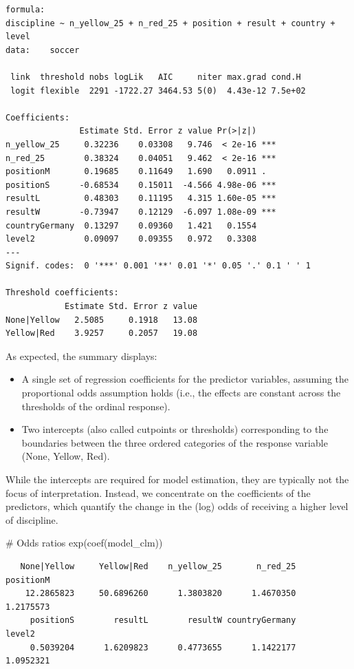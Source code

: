 \documentclass[
  letterpaper,
  DIV=11,
  numbers=noendperiod]{scrartcl}
\newenvironment{Shaded}{\begin{snugshade}}{\end{snugshade}}
\newcommand{\CommentTok}[1]{\textcolor[rgb]{0.37,0.37,0.37}{#1}}
\newcommand{\FunctionTok}[1]{\textcolor[rgb]{0.28,0.35,0.67}{#1}}
\newcommand{\NormalTok}[1]{\textcolor[rgb]{0.00,0.23,0.31}{#1}}
\begin{document}
\begin{verbatim}
formula: 
discipline ~ n_yellow_25 + n_red_25 + position + result + country + level
data:    soccer

 link  threshold nobs logLik   AIC     niter max.grad cond.H 
 logit flexible  2291 -1722.27 3464.53 5(0)  4.43e-12 7.5e+02

Coefficients:
               Estimate Std. Error z value Pr(>|z|)    
n_yellow_25     0.32236    0.03308   9.746  < 2e-16 ***
n_red_25        0.38324    0.04051   9.462  < 2e-16 ***
positionM       0.19685    0.11649   1.690   0.0911 .  
positionS      -0.68534    0.15011  -4.566 4.98e-06 ***
resultL         0.48303    0.11195   4.315 1.60e-05 ***
resultW        -0.73947    0.12129  -6.097 1.08e-09 ***
countryGermany  0.13297    0.09360   1.421   0.1554    
level2          0.09097    0.09355   0.972   0.3308    
---
Signif. codes:  0 '***' 0.001 '**' 0.01 '*' 0.05 '.' 0.1 ' ' 1

Threshold coefficients:
            Estimate Std. Error z value
None|Yellow   2.5085     0.1918   13.08
Yellow|Red    3.9257     0.2057   19.08
\end{verbatim}

As expected, the summary displays:

\begin{itemize}
\item
  A single set of regression coefficients for the predictor variables,
  assuming the proportional odds assumption holds (i.e., the effects are
  constant across the thresholds of the ordinal response).
\item
  Two intercepts (also called cutpoints or thresholds) corresponding to
  the boundaries between the three ordered categories of the response
  variable (None, Yellow, Red).
\end{itemize}

While the intercepts are required for model estimation, they are
typically not the focus of interpretation. Instead, we concentrate on
the coefficients of the predictors, which quantify the change in the
(log) odds of receiving a higher level of discipline.

\begin{Shaded}
\begin{Highlighting}[]
\CommentTok{\# Odds ratios}
\FunctionTok{exp}\NormalTok{(}\FunctionTok{coef}\NormalTok{(model\_clm))}
\end{Highlighting}
\end{Shaded}

\begin{verbatim}
   None|Yellow     Yellow|Red    n_yellow_25       n_red_25      positionM 
    12.2865823     50.6896260      1.3803820      1.4670350      1.2175573 
     positionS        resultL        resultW countryGermany         level2 
     0.5039204      1.6209823      0.4773655      1.1422177      1.0952321 
\end{verbatim}
\end{document}
